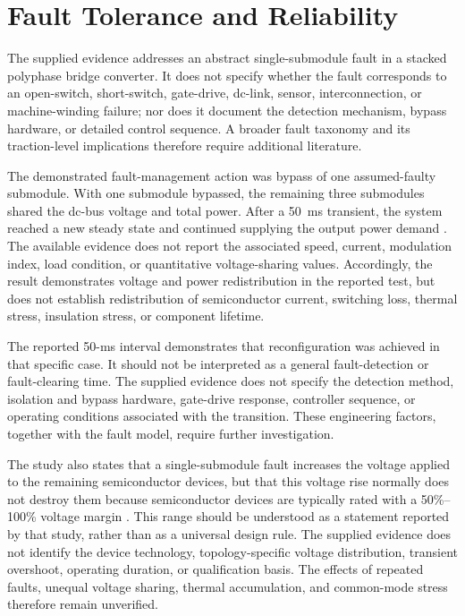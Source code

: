 \section{Fault Tolerance and Reliability}

The supplied evidence addresses an abstract single-submodule fault in a stacked polyphase bridge converter. It does not specify whether the fault corresponds to an open-switch, short-switch, gate-drive, dc-link, sensor, interconnection, or machine-winding failure; nor does it document the detection mechanism, bypass hardware, or detailed control sequence. A broader fault taxonomy and its traction-level implications therefore require additional literature. %

The demonstrated fault-management action was bypass of one assumed-faulty submodule. With one submodule bypassed, the remaining three submodules shared the dc-bus voltage and total power. After a 50~ms transient, the system reached a new steady state and continued supplying the output power demand \cite{Jin2017}. The available evidence does not report the associated speed, current, modulation index, load condition, or quantitative voltage-sharing values. Accordingly, the result demonstrates voltage and power redistribution in the reported test, but does not establish redistribution of semiconductor current, switching loss, thermal stress, insulation stress, or component lifetime.

The reported 50-ms interval demonstrates that reconfiguration was achieved in that specific case. It should not be interpreted as a general fault-detection or fault-clearing time. The supplied evidence does not specify the detection method, isolation and bypass hardware, gate-drive response, controller sequence, or operating conditions associated with the transition. These engineering factors, together with the fault model, require further investigation. %

The study also states that a single-submodule fault increases the voltage applied to the remaining semiconductor devices, but that this voltage rise normally does not destroy them because semiconductor devices are typically rated with a 50\%--100\% voltage margin \cite{Jin2017}. This range should be understood as a statement reported by that study, rather than as a universal design rule. The supplied evidence does not identify the device technology, topology-specific voltage distribution, transient overshoot, operating duration, or qualification basis. The effects of repeated faults, unequal voltage sharing, thermal accumulation, and common-mode stress therefore remain unverified. %

